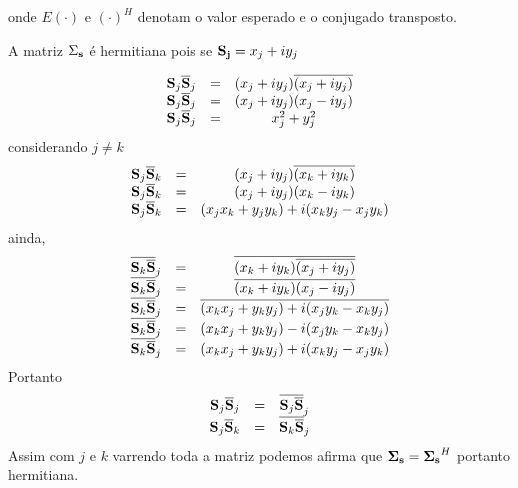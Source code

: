 \documentclass[10pt,a4paper]{article}
\begin{document}
onde $E(\cdot)$ e $(\cdot)^H$ denotam o valor esperado e o conjugado transposto.

A matriz {\bf $\Sigma_{{\bf s}}$} é hermitiana pois se ${\bf S_j }= x_j+iy_j $

\begin{equation}\label{sec1eqn3}
\begin{array}{ccc}
	{\bf S}_j\overline{{\bf S}}_j&=& (x_j+iy_j)\overline{(x_j+iy_j)} \\
	{\bf S}_j\overline{{\bf S}}_j&=& (x_j+iy_j)(x_j-iy_j) \\
	{\bf S}_j\overline{{\bf S}}_j&=& x_j^2+y_j^2 \\
\end{array}
\end{equation}
considerando $j \neq k$
\begin{equation}\label{sec1eqn4}
\begin{array}{ccc}
	{\bf S}_j\overline{{\bf S}}_k&=& (x_j+iy_j)\overline{(x_k+iy_k)} \\
	{\bf S}_j\overline{{\bf S}}_k&=& (x_j+iy_j)(x_k-iy_k) \\
	{\bf S}_j\overline{{\bf S}}_k&=& (x_jx_k+y_jy_k)+i(x_ky_j-x_jy_k) \\
\end{array}
\end{equation}
ainda,
\begin{equation}\label{sec1eqn5}
\begin{array}{ccc}
	\overline{{\bf S}_k\overline{{\bf S}}}_j&=&\overline{ (x_k+iy_k)\overline{(x_j+iy_j)} }\\
	\overline{{\bf S}_k\overline{{\bf S}}}_j&=&\overline{ (x_k+iy_k)(x_j-iy_j)} \\
	\overline{{\bf S}_k\overline{{\bf S}}}_j&=&\overline{ (x_kx_j+y_ky_j)+i(x_jy_k-x_ky_j) }\\
	\overline{{\bf S}_k\overline{{\bf S}}}_j&=&(x_kx_j+y_ky_j)-i(x_jy_k-x_ky_j) \\
	\overline{{\bf S}_k\overline{{\bf S}}}_j&=&(x_kx_j+y_ky_j)+i(x_ky_j-x_jy_k) \\
\end{array}
\end{equation}
Portanto
\begin{equation}\label{sec1eqn6}
\begin{array}{ccc}
	{\bf S}_j\overline{{\bf S}}_j&=&\overline{{\bf S}_j\overline{{\bf S}}}_j \\
	{\bf S}_j\overline{{\bf S}}_k&=&\overline{{\bf S}_k\overline{{\bf S}}}_j \\
\end{array}
\end{equation}
Assim com $j$ e $k$ varrendo toda a matriz podemos afirma que ${\bf \Sigma_{{\bf s}}}={\bf \Sigma_{{\bf s}}}^H$ portanto hermitiana.
\end{document}
